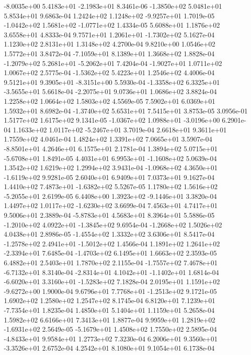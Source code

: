 -8.0035e+00  5.4183e+01 -2.1983e+01  8.3461e-06
-1.3850e+02  5.0481e+01  5.8534e+01  9.6863e-04
 1.2424e+02  1.1248e+02 -9.9257e+01  1.7019e-05
-1.0442e+02  1.5681e+02 -1.0771e+02  1.4334e-05
5.6088e+01 1.1876e+02 3.6558e+01  4.8333e-04
 9.7571e+01  1.2061e+01 -1.7302e+02  5.1627e-04
1.1230e+02 2.8131e+01 1.3148e+02  4.2700e-04
9.8210e+00 1.0546e+02 1.5772e+01  3.8472e-04
-7.1059e+01  8.1389e+01  1.3668e+02  1.8828e-04
-1.2079e+02  5.2681e+01 -5.2062e+01  7.4204e-04
-1.9027e+01  1.0711e+02  1.0067e+02  2.5775e-04
-1.5362e+02  5.4223e+01  1.2546e+02  4.4006e-04
 9.5121e+01  9.3905e+01 -8.3151e+00  5.5930e-04
-1.3358e+02  6.3325e+01 -3.5655e+01  5.6618e-04
-2.2075e+01  9.0736e+01  1.0686e+02  3.8824e-04
1.2258e+02 1.0664e+02 1.5803e+02  4.5569e-05
7.5902e+01 6.0369e+01 1.5932e+01  8.6982e-04
-1.3740e+02  5.6531e+01  7.5415e+01  3.8753e-05
3.0956e-01 1.5177e+02 1.6175e+02  9.1341e-05
-1.0367e+02  1.0988e+01 -3.0196e+00  6.2901e-04
 1.1633e+02  1.0117e+02 -5.2467e+01  3.7019e-04
2.6618e+01 9.3611e+01 1.7559e+02  4.0461e-04
1.4824e+02 1.3391e+02 7.0665e+01  3.5907e-04
-8.8501e+01  4.2646e+01  6.1575e+01  2.1781e-04
 1.3894e+02  5.0715e+01 -5.6708e+01  1.8491e-05
 4.4031e+01  6.9953e+01 -1.1608e+02  5.0639e-04
1.3542e+02 1.6219e+02 1.2994e+02  3.9431e-04
-1.0968e+02  4.3650e+01 -1.6119e+02  9.9281e-05
2.6040e+01 6.9409e+01 7.0373e+01  9.1627e-04
 1.4410e+02  7.4873e+01 -1.6382e+02  5.5267e-05
 1.1780e+02  1.5616e+02 -5.2055e+01  2.6199e-05
 6.4408e+00  1.3923e+02 -9.1446e+01  3.3820e-04
 1.4497e+02  1.0117e+02 -1.6230e+02  3.6699e-04
7.4563e+01 4.7417e+01 9.5006e+01  2.3889e-04
-5.8783e+01  4.5683e+01  8.3964e+01  5.5886e-05
-1.2010e+02  4.0922e+01 -1.3845e+02  9.6954e-04
-1.2668e+02  1.5026e+02  4.0438e+01  2.8986e-05
-1.4554e+02  1.3332e+02  3.6306e+01  8.5417e-04
-1.2578e+02  2.4941e+01 -1.5012e+02  1.4566e-04
 1.1891e+02  1.2641e+02 -2.3394e+01  7.6485e-04
-1.4703e+02  6.1495e+01  1.6663e+02  2.3593e-05
6.4882e+01 2.5403e+01 1.7870e+02  2.1155e-04
-1.7557e+02  7.4678e+01 -6.7132e+01  8.3140e-04
-2.8314e+01  4.1042e+01 -1.1402e+01  1.6814e-04
-6.6020e+01  3.3160e+01 -1.5283e+02  7.1828e-04
 2.0195e+01  1.1591e+02 -9.6272e+00  1.9000e-04
 9.6796e+01  7.7768e+01 -1.2513e+02  9.1721e-05
1.6902e+02 1.2580e+02 1.2547e+02  8.1745e-04
 6.8120e+01  7.1239e+01 -7.7354e+01  1.8235e-04
1.4850e+01 5.1404e+01 1.1159e+01  5.2658e-04
1.5982e+02 6.6166e+01 7.3413e+01  1.8877e-04
 9.9959e+01  1.2819e+02 -1.6931e+02  2.5649e-05
-5.1679e+01  1.4508e+02  1.7550e+02  2.5895e-04
-4.8433e+01  9.9584e+01  1.2773e+02  7.3230e-04
 6.2006e+01  9.3560e+01 -3.3526e+01  2.6752e-04
4.2542e+01 8.1080e+01 9.1054e+01  6.1738e-04
